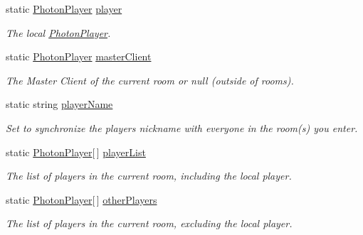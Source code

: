 \begin{DoxyCompactItemize}
static \hyperlink{class_photon_player}{Photon\+Player} \hyperlink{class_photon_network_a1b3803f17c6d713593bca41547b8b9b3}{player}
\begin{DoxyCompactList}\small\item\em The local \hyperlink{class_photon_player}{Photon\+Player}. \end{DoxyCompactList}\item 
static \hyperlink{class_photon_player}{Photon\+Player} \hyperlink{class_photon_network_aa7e51b5e5f9f8b89f057096f47d11c5b}{master\+Client}
\begin{DoxyCompactList}\small\item\em The Master Client of the current room or null (outside of rooms). \end{DoxyCompactList}\item 
static string \hyperlink{class_photon_network_abb168e543c15731ec4de869d3a1ad8f4}{player\+Name}
\begin{DoxyCompactList}\small\item\em Set to synchronize the player\textquotesingle{}s nickname with everyone in the room(s) you enter. \end{DoxyCompactList}\item 
static \hyperlink{class_photon_player}{Photon\+Player}\mbox{[}$\,$\mbox{]} \hyperlink{class_photon_network_a2dc5e6cba79f899d9952f804db35b2f3}{player\+List}
\begin{DoxyCompactList}\small\item\em The list of players in the current room, including the local player. \end{DoxyCompactList}\item 
static \hyperlink{class_photon_player}{Photon\+Player}\mbox{[}$\,$\mbox{]} \hyperlink{class_photon_network_a894df24398c8cfe2d06e22ddc39576fa}{other\+Players}
\begin{DoxyCompactList}\small\item\em The list of players in the current room, excluding the local player. \end{DoxyCompactList}\item 

\end{DoxyCompactItemize}
